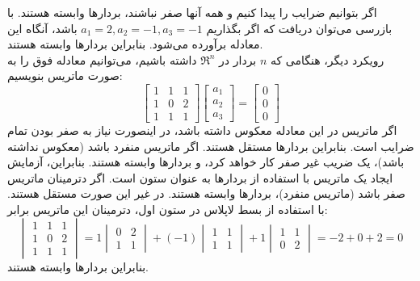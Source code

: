 \documentclass[a4paper,12pt]{report}
\begin{document}
  	  اگر بتوانیم ضرایب را پیدا کنیم و همه آنها صفر نباشند، بردارها وابسته هستند. با بازرسی می‌توان دریافت که اگر بگذاریم
  	   $ a_1 = 2 , a_2 = -1 , a_3 = -1 $
  	    باشد، آنگاه این معادله برآورده می‌شود. بنابراین بردارها وابسته هستند.\\
  	    
  	    رویکرد دیگر، هنگامی که $ n $ بردار در $ \Re^n $ داشته باشیم، می‌توانیم معادله فوق را به صورت ماتریس بنویسیم:
  	    $$
  	    \begin{bmatrix}
  	    	1 & 1 & 1
  	    	\\
  	    	1 & 0 & 2
  	    	\\
  	    	1 & 1 & 1
  	    \end{bmatrix}  	    
  	    \begin{bmatrix}
  	    	a_1 \\ a_2 \\ a_3
  	    \end{bmatrix}
      =
  	    \begin{bmatrix}
  	    	0 \\ 0 \\ 0
  	    \end{bmatrix}
  	    $$
  	    اگر ماتریس در این معادله معکوس داشته باشد، در اینصورت نیاز به صفر بودن تمام ضرایب است. بنابراین بردارها مستقل هستند. اگر ماتریس منفرد باشد (معکوس نداشته باشد)، یک ضریب غیر صفر کار خواهد کرد، و بردارها وابسته هستند. بنابراین، آزمایش ایجاد یک ماتریس با استفاده از بردارها به عنوان ستون است. اگر دترمینان ماتریس صفر باشد (ماتریس منفرد)، بردارها وابسته هستند. در غیر این صورت مستقل هستند. با استفاده از بسط لاپلاس \lr{[Brog91]} در ستون اول، دترمینان این ماتریس برابر:
  	    $$
  	    \begin{vmatrix}
  	    	1 & 1 & 1
  	    	\\
  	    	1 & 0 & 2
  	    	\\
  	    	1 & 1 & 1
  	    \end{vmatrix}  	    
      	=1
  	    \begin{vmatrix}
  	    	0 & 2 \\ 1 & 1
  	    \end{vmatrix}
  	    +(-1)
  	    \begin{vmatrix}
  	    	1 & 1 \\ 1 & 1
  	    \end{vmatrix}
      	+1
      	\begin{vmatrix}
      		1 & 1 \\ 0 & 2
      	\end{vmatrix}
      	=-2+0+2=0
  	    $$
  	    بنابراین بردارها وابسته هستند.
  	    
\end{document}
